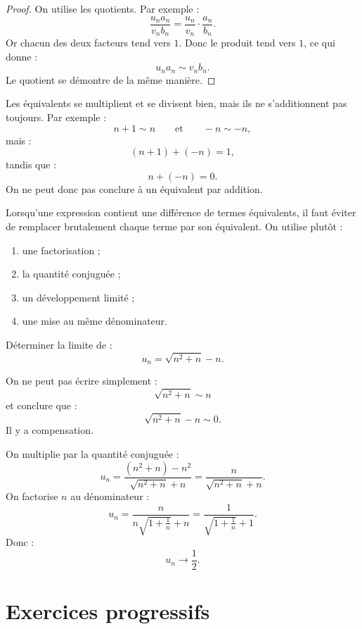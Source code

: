 \documentclass[11pt,a4paper]{article}
\begin{document}
\begin{proof}
On utilise les quotients. Par exemple :
\[
\frac{u_n a_n}{v_n b_n}
=
\frac{u_n}{v_n}\cdot\frac{a_n}{b_n}.
\]
Or chacun des deux facteurs tend vers \(1\). Donc le produit tend vers \(1\), ce qui donne :
\[
u_n a_n\sim v_n b_n.
\]
Le quotient se démontre de la même manière.
\end{proof}

\begin{erreurbox}
Les équivalents se multiplient et se divisent bien, mais ils ne s'additionnent pas toujours.
Par exemple :
\[
n+1\sim n
\qquad\text{et}\qquad
-n\sim -n,
\]
mais :
\[
(n+1)+(-n)=1,
\]
tandis que :
\[
n+(-n)=0.
\]
On ne peut donc pas conclure à un équivalent par addition.
\end{erreurbox}

\begin{methodbox}
Lorsqu'une expression contient une différence de termes équivalents, il faut éviter de remplacer brutalement chaque terme par son équivalent. On utilise plutôt :
\begin{enumerate}
    \item une factorisation ;
    \item la quantité conjuguée ;
    \item un développement limité ;
    \item une mise au même dénominateur.
\end{enumerate}
\end{methodbox}

\begin{exercicebox}
Déterminer la limite de :
\[
u_n=\sqrt{n^2+n}-n.
\]
\end{exercicebox}

\begin{correctionbox}
On ne peut pas écrire simplement :
\[
\sqrt{n^2+n}\sim n
\]
et conclure que :
\[
\sqrt{n^2+n}-n\sim0.
\]
Il y a compensation.

On multiplie par la quantité conjuguée :
\[
u_n
=
\frac{(n^2+n)-n^2}{\sqrt{n^2+n}+n}
=
\frac{n}{\sqrt{n^2+n}+n}.
\]
On factorise \(n\) au dénominateur :
\[
u_n
=
\frac{n}{n\sqrt{1+\frac1n}+n}
=
\frac1{\sqrt{1+\frac1n}+1}.
\]
Donc :
\[
u_n\to\frac12.
\]
\end{correctionbox}

\newpage
\section{Exercices progressifs}
\end{document}
